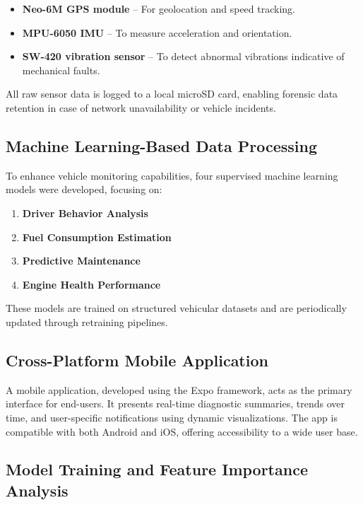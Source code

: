 \begin{itemize}
    \item \textbf{Neo-6M GPS module} – For geolocation and speed tracking.
    \item \textbf{MPU-6050 IMU} – To measure acceleration and orientation.
    \item \textbf{SW-420 vibration sensor} – To detect abnormal vibrations indicative of mechanical faults.
\end{itemize}

All raw sensor data is logged to a local microSD card, enabling forensic data retention in case of network unavailability or vehicle incidents.

\subsection{Machine Learning-Based Data Processing}

To enhance vehicle monitoring capabilities, four supervised machine learning models were developed, focusing on:

\begin{enumerate}
    \item \textbf{Driver Behavior Analysis}
    \item \textbf{Fuel Consumption Estimation}
    \item \textbf{Predictive Maintenance}
    \item \textbf{Engine Health Performance}
\end{enumerate}

These models are trained on structured vehicular datasets and are periodically updated through retraining pipelines.

\subsection{Cross-Platform Mobile Application}

A mobile application, developed using the Expo framework, acts as the primary interface for end-users. It presents real-time diagnostic summaries, trends over time, and user-specific notifications using dynamic visualizations. The app is compatible with both Android and iOS, offering accessibility to a wide user base.

\subsection{Model Training and Feature Importance Analysis}

